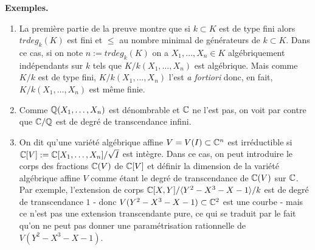   \textbf{Exemples.}
 \begin{enumerate}[leftmargin=* ,parsep=0cm,itemsep=0cm,topsep=0cm]
 \item La première partie de la preuve montre que si $k\subset K$ est de type fini alors $trdeg_k(K)$ est fini et $\leq$ au nombre minimal de générateurs de $k\subset K$. Dans ce cas,  si on note $n:=trdeg_k(K)$ on a  $X_1,\dots, X_n\in K$ algébriquement indépendants sur $k$ tels que $K/k(X_1,\dots, X_n)$ est algébrique. Mais comme $K/k$ est de type fini,  $K/k(X_1,\dots, X_n)$ l'est \textit{a fortiori} donc, en fait, $K/k(X_1,\dots, X_n)$ est même finie.
\item  Comme $\mathbb{Q}(X_1,\dots, X_n)$ est dénombrable et $\mathbb{C}$ ne l'est pas, on voit par contre que $\mathbb{C}/\mathbb{Q}$ est de degré de transcendance infini.
\item On dit qu'une variété algébrique affine $V=V(I)\subset \mathbb{C}^n$ est irréductible si $\mathbb{C}[V]:=\mathbb{C}[X_1,\dots, X_n]/\sqrt{I}$ est intègre. Dans ce cas, on peut introduire le corps des fractions $\mathbb{C}(V)$ de $\mathbb{C}[V]$ et définir la dimension  de la variété algébrique affine $V$ comme étant le degré de transcendance de $\mathbb{C}(V)$ sur $\mathbb{C}$. Par exemple, l'extension de corps $\mathbb{C}[X,Y]/\langle Y^2-X^3-X-1\rangle/k$   est de degré de transcendance $1$ - donc $ V(Y^2-X^3-X-1)\subset \mathbb{C}^2$ est une courbe - mais ce n'est pas une extension transcendante pure, ce qui se traduit par le fait qu'on ne peut pas donner une paramétrisation rationnelle de $ V(Y^2-X^3-X-1)$.
 \end{enumerate}

